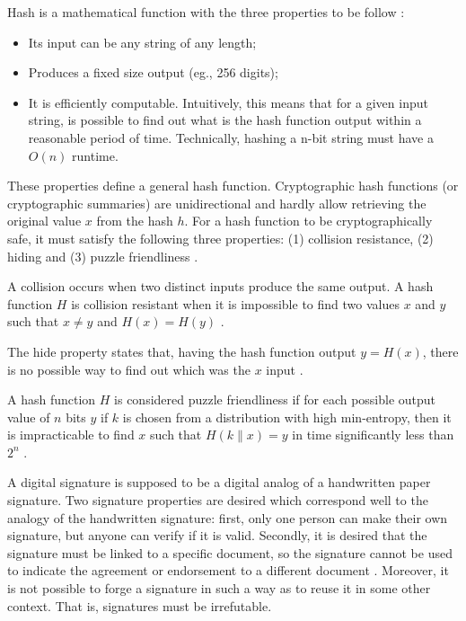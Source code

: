 \label{sec:hashesCriptograficos}
Hash is a mathematical function with the three properties to be follow \cite{narayanan2016bitcoin}:

\begin{itemize}
\item  Its input can be any string of any length;
\item Produces a fixed size output (eg., 256 digits);
\item It is efficiently computable. Intuitively, this means that for
a given input string, is possible to find out what is the hash function output within a reasonable period of time. Technically, hashing a n-bit string must have a $O(n)$ runtime.
\end{itemize}

These properties define a general hash function. Cryptographic hash functions (or cryptographic summaries) are unidirectional and hardly allow retrieving the original value $x$ from the hash $h$. For a hash function to be cryptographically safe, it must satisfy the following three properties: (1) collision resistance, (2) hiding and (3) puzzle friendliness \cite{greve2018blockchain}.

A collision occurs when two distinct inputs produce the same output. A hash function $H$ is collision resistant when it is impossible to find two values $x$ and $y$ such that $x \neq y$ and $H(x) = H(y)$ \cite{narayanan2016bitcoin}.

The hide property states that, having the hash function output $y = H (x)$, there is no possible way to find out which was the $x$ input \cite{greve2018blockchain}.

A hash function $H$ is considered puzzle friendliness if for each possible output value of $n$ bits $y$ if $k$ is chosen from a distribution with high min-entropy, then it is impracticable to find $x$ such that $H (k \| x) = y$ in time significantly less than $2^n$ \cite{narayanan2016bitcoin}.

\label{sec:assinaturasDigitais}
A digital signature is supposed to be a digital analog of a handwritten paper signature. Two signature properties are desired which correspond well to the analogy of the handwritten signature: first, only one person can make their own signature, but anyone can verify if it is valid. Secondly, it is desired that the signature must be linked to a specific document, so the signature cannot be used to indicate the agreement or endorsement to a different document \cite{merkle1989certified}. Moreover, it is not possible to forge a signature in such a way as to reuse it in some other context. That is, signatures must be irrefutable.

